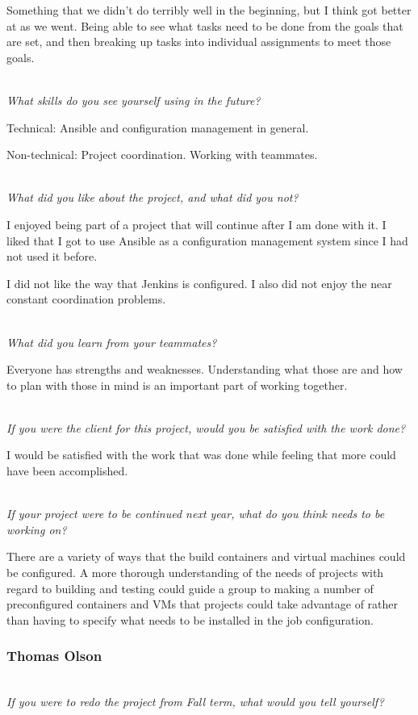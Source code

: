 \documentclass[10pt,letterpaper,onecolumn,draftclsnofoot]{IEEEtran}
\begin{document}
Something that we didn't do terribly well in the beginning, but I think got better at as we went. Being able to see what tasks need to be done from the goals that are set, and then breaking up tasks into individual assignments to meet those goals.

\textit{\\What skills do you see yourself using in the future?}

Technical: Ansible and configuration management in general.

Non-technical: Project coordination. Working with teammates.

\textit{\\What did you like about the project, and what did you not?}

I enjoyed being part of a project that will continue after I am done with it. I liked that I got to use Ansible as a configuration management system since I had not used it before.

I did not like the way that Jenkins is configured. I also did not enjoy the near constant coordination problems.

\textit{\\What did you learn from your teammates?}

Everyone has strengths and weaknesses. Understanding what those are and how to plan with those in mind is an important part of working together.

\textit{\\If you were the client for this project, would you be satisfied with the work done?}

I would be satisfied with the work that was done while feeling that more could have been accomplished.

\textit{\\If your project were to be continued next year, what do you think needs to be working on?}

There are a variety of ways that the build containers and virtual machines could be configured. A more thorough understanding of the needs of projects with regard to building and testing could guide a group to making a number of preconfigured containers and VMs that projects could take advantage of rather than having to specify what needs to be installed in the job configuration.\\

\subsubsection{Thomas Olson}
\textit{\\If you were to redo the project from Fall term, what would you tell yourself?}
\end{document}
